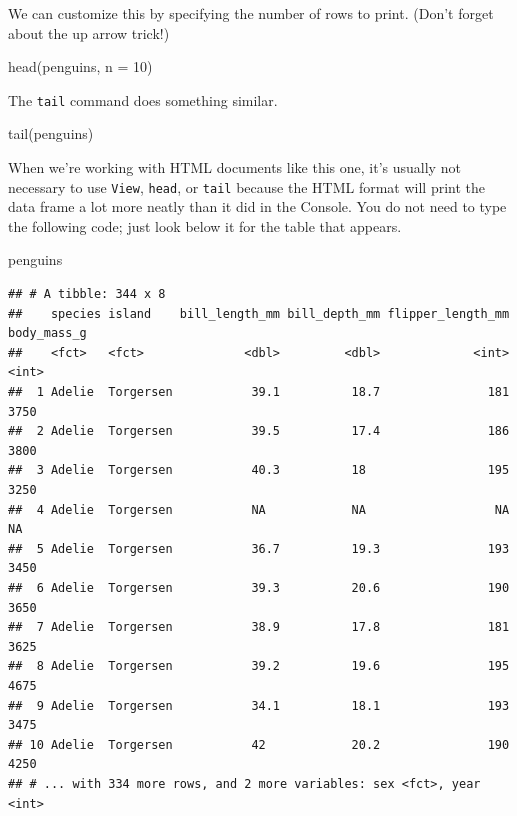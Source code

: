 \documentclass[
]{book}
\newenvironment{Shaded}{\begin{snugshade}}{\end{snugshade}}
\newcommand{\AttributeTok}[1]{\textcolor[rgb]{0.77,0.63,0.00}{#1}}
\newcommand{\DecValTok}[1]{\textcolor[rgb]{0.00,0.00,0.81}{#1}}
\newcommand{\FunctionTok}[1]{\textcolor[rgb]{0.00,0.00,0.00}{#1}}
\newcommand{\NormalTok}[1]{#1}
\begin{document}
We can customize this by specifying the number of rows to print. (Don't forget about the up arrow trick!)

\begin{Shaded}
\begin{Highlighting}[]
\FunctionTok{head}\NormalTok{(penguins, }\AttributeTok{n =} \DecValTok{10}\NormalTok{)}
\end{Highlighting}
\end{Shaded}

The \texttt{tail} command does something similar.

\begin{Shaded}
\begin{Highlighting}[]
\FunctionTok{tail}\NormalTok{(penguins)}
\end{Highlighting}
\end{Shaded}

When we're working with HTML documents like this one, it's usually not necessary to use \texttt{View}, \texttt{head}, or \texttt{tail} because the HTML format will print the data frame a lot more neatly than it did in the Console. You do not need to type the following code; just look below it for the table that appears.

\begin{Shaded}
\begin{Highlighting}[]
\NormalTok{penguins}
\end{Highlighting}
\end{Shaded}

\begin{verbatim}
## # A tibble: 344 x 8
##    species island    bill_length_mm bill_depth_mm flipper_length_mm body_mass_g
##    <fct>   <fct>              <dbl>         <dbl>             <int>       <int>
##  1 Adelie  Torgersen           39.1          18.7               181        3750
##  2 Adelie  Torgersen           39.5          17.4               186        3800
##  3 Adelie  Torgersen           40.3          18                 195        3250
##  4 Adelie  Torgersen           NA            NA                  NA          NA
##  5 Adelie  Torgersen           36.7          19.3               193        3450
##  6 Adelie  Torgersen           39.3          20.6               190        3650
##  7 Adelie  Torgersen           38.9          17.8               181        3625
##  8 Adelie  Torgersen           39.2          19.6               195        4675
##  9 Adelie  Torgersen           34.1          18.1               193        3475
## 10 Adelie  Torgersen           42            20.2               190        4250
## # ... with 334 more rows, and 2 more variables: sex <fct>, year <int>
\end{verbatim}
\end{document}
